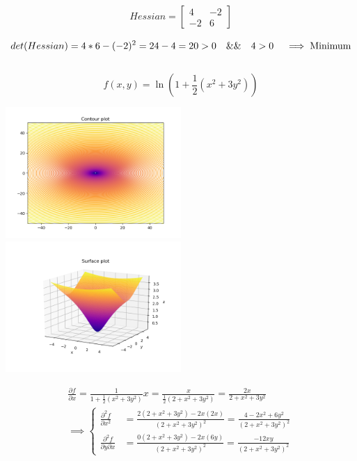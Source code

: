 \documentclass[12pt]{article}         %
\begin{document}
\begin{gather}
Hessian = 
  \begin{bmatrix}
   4 &
   -2\\
   -2 &
   6 
   \end{bmatrix}
   \nonumber
\end{gather}

$$
det(Hessian) = 4*6-(-2)^2=24-4=20 >0  \quad \&\& \quad 4 > 0 \quad\implies \text{Minimum}\\ %
$$\\


\begin{equation}
	f(x,y) = \ln(1 + \dfrac{1}{2}(x^2 +3y^2))
\end{equation}

\includegraphics[width=0.5\textwidth]{Figure_4}
\includegraphics[width=0.5\textwidth]{Surface_4}

$$
\begin{aligned}
\frac {\partial f}{\partial x} = \frac{1}{1+\frac{1}{2}(x^2+3y^2)}x= \frac{x}{\frac{1}{2}(2+x^2+3y^2)}=\frac{2x}{2+x^2+3y^2}\\
\implies 
	\left\{
	\begin{aligned}
		\frac {\partial^2 f}{\partial x^2}&=\frac{2(2+x^2+3y^2)-2x(2x)}{(2+x^2+3y^2)^2}=
		 	\frac{4-2x^2+6y^2}{(2+x^2+3y^2)^2} \\
		\frac {\partial^2 f}{\partial y \partial x}&=\frac{0(2+x^2+3y^2)-2x(6y)}{(2+x^2+3y^2)^2}=
		 	\frac{-12xy}{(2+x^2+3y^2)^2} 
	 \end{aligned} 
	 \right.
\end{aligned}
$$
\end{document}
